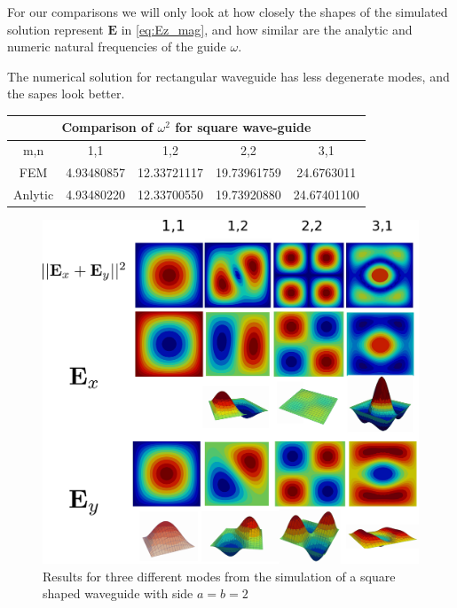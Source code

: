 For our comparisons we will only look at how closely the shapes of the simulated solution represent $\mathbf{E}$ in \ref{eq:Ez_mag}, and how similar are the analytic and numeric  natural frequencies of the guide $\omega$.

The numerical solution for rectangular waveguide has less degenerate modes, and the sapes look better.
\begin{center}
\begin{tabular}{|c|c|c|c|c|}
\hline
\multicolumn{5}{|c|}{Comparison of $\omega^2$ for square wave-guide} \\
\hline 
m,n & 1,1 & 1,2 & 2,2 & 3,1 \\ 
\hline 
FEM & 4.93480857 & 12.33721117 & 19.73961759 & 24.6763011 \\ 
\hline 
Anlytic & 4.93480220 & 12.33700550 & 19.73920880 & 24.67401100 \\ 
\hline 
\end{tabular} 
\label{tab:sq_wav_comparison}
\end{center}

\begin{figure}
\centering
\includegraphics[scale=0.1]{./img/square_waveguide.pdf}
\caption{Results for three different modes from the simulation of a square shaped waveguide with side $a=b=2$}
\label{fig:square_waveguide}
\end{figure}


